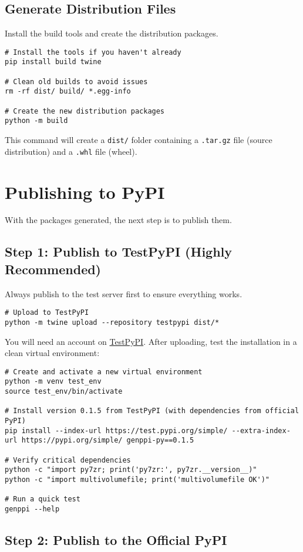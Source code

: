 \documentclass[11pt, a4paper]{article}
\begin{document}
\subsection{Generate Distribution Files}
Install the build tools and create the distribution packages.
\begin{lstlisting}[style=bashstyle]
# Install the tools if you haven't already
pip install build twine

# Clean old builds to avoid issues
rm -rf dist/ build/ *.egg-info

# Create the new distribution packages
python -m build
\end{lstlisting}
This command will create a \texttt{dist/} folder containing a \texttt{.tar.gz} file (source distribution) and a \texttt{.whl} file (wheel).

\section{Publishing to PyPI}
With the packages generated, the next step is to publish them.

\subsection{Step 1: Publish to TestPyPI (Highly Recommended)}
Always publish to the test server first to ensure everything works.
\begin{lstlisting}[style=bashstyle]
# Upload to TestPyPI
python -m twine upload --repository testpypi dist/*
\end{lstlisting}
You will need an account on \href{https://test.pypi.org/}{TestPyPI}. After uploading, test the installation in a clean virtual environment:
\begin{lstlisting}[style=bashstyle]
# Create and activate a new virtual environment
python -m venv test_env
source test_env/bin/activate

# Install version 0.1.5 from TestPyPI (with dependencies from official PyPI)
pip install --index-url https://test.pypi.org/simple/ --extra-index-url https://pypi.org/simple/ genppi-py==0.1.5

# Verify critical dependencies
python -c "import py7zr; print('py7zr:', py7zr.__version__)"
python -c "import multivolumefile; print('multivolumefile OK')"

# Run a quick test
genppi --help
\end{lstlisting}

\subsection{Step 2: Publish to the Official PyPI}
\end{document}
